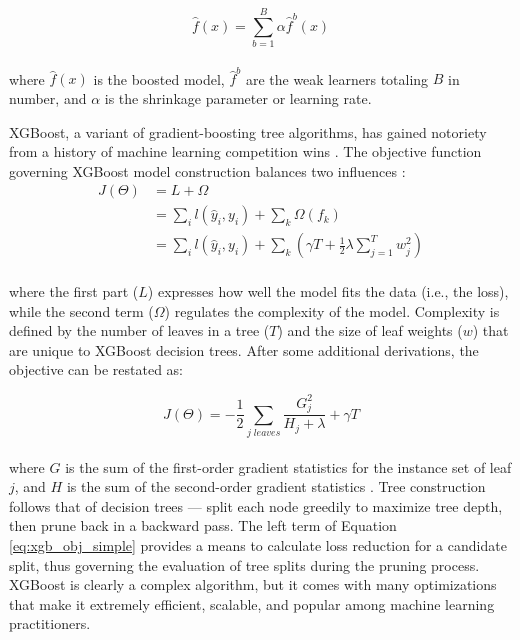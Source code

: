 \begin{equation}
\label{eq:xgb_form}
    \hat{f}(x) = \sum_{b=1}^{B}{\alpha \hat{f}^{b}(x)}
\end{equation}
\\
where $\hat{f}(x)$ is the boosted model, $\hat{f}^b$ are the weak learners totaling $B$ in number, and $\alpha$ is the shrinkage parameter or learning rate. 

XGBoost, a variant of gradient-boosting tree algorithms, has gained notoriety from a history of machine learning competition wins \citep{chen_dmlcxgboost_2021}. The objective function governing XGBoost model construction balances two influences \citep{chen_xgboost_2016}:
\begin{equation}
\label{eq:xgb_objective}
\begin{aligned}
    J(\Theta) &= L + \Omega \\
    &= \sum_{i}{l(\hat{y}_i,y_i)}+\sum_{k}{\Omega(f_k)} \\
    &= \sum_{i}{l(\hat{y}_i,y_i)}+\sum_{k}{\left({\gamma T}+\frac{1}{2} \lambda \sum_{j=1}^T{w_j^2}\right)}
\end{aligned}
\end{equation}
\\
where the first part ($L$) expresses how well the model fits the data (i.e., the loss), while the second term ($\Omega$) regulates the complexity of the model. Complexity is defined by the number of leaves in a tree ($T$) and the size of leaf weights ($w$) that are unique to XGBoost decision trees. After some additional derivations, the objective can be restated as:

\begin{equation}
\label{eq:xgb_obj_simple}
    J(\Theta) = -\frac{1}{2}\sum_{j\;leaves}{\frac{G_j^2}{H_j + \lambda} + \gamma T}
\end{equation}
\\
where $G$ is the sum of the first-order gradient statistics for the instance set of leaf $j$, and $H$ is the sum of the second-order gradient statistics \citep{chen_xgboost_2016}. Tree construction follows that of decision trees --- split each node greedily to maximize tree depth, then prune back in a backward pass. The left term of Equation \ref{eq:xgb_obj_simple} provides a means to calculate loss reduction for a candidate split, thus governing the evaluation of tree splits during the pruning process. XGBoost is clearly a complex algorithm, but it comes with many optimizations that make it extremely efficient, scalable, and popular among machine learning practitioners.

